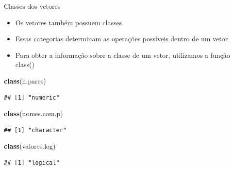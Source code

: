 \documentclass[
  10pt,
  ignorenonframetext,
]{beamer}
\newenvironment{Shaded}{\begin{snugshade}}{\end{snugshade}}
\newcommand{\KeywordTok}[1]{\textcolor[rgb]{0.13,0.29,0.53}{\textbf{#1}}}
\newcommand{\NormalTok}[1]{#1}
\providecommand{\tightlist}{%
  \setlength{\itemsep}{0pt}\setlength{\parskip}{0pt}}
\begin{document}
\begin{frame}[fragile]{Classes dos vetores}
\protect\hypertarget{classes-dos-vetores}{}
\begin{itemize}
\tightlist
\item
  Os vetores também possuem classes
\item
  Essas categorias determinam as operações possíveis dentro de um vetor
\item
  Para obter a informação sobre a classe de um vetor, utilizamos a
  função class()
\end{itemize}

\begin{Shaded}
\begin{Highlighting}[]
\KeywordTok{class}\NormalTok{(n.pares)}
\end{Highlighting}
\end{Shaded}

\begin{verbatim}
## [1] "numeric"
\end{verbatim}

\begin{Shaded}
\begin{Highlighting}[]
\KeywordTok{class}\NormalTok{(nomes.com.p)}
\end{Highlighting}
\end{Shaded}

\begin{verbatim}
## [1] "character"
\end{verbatim}

\begin{Shaded}
\begin{Highlighting}[]
\KeywordTok{class}\NormalTok{(valores.log)}
\end{Highlighting}
\end{Shaded}

\begin{verbatim}
## [1] "logical"
\end{verbatim}
\end{frame}
\end{document}
